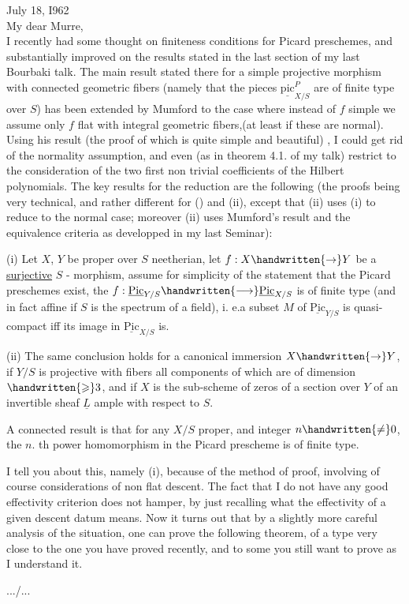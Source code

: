 July 18, I962\\

My dear Murre,\\

I recently had some thought on finiteness conditions for Picard preschemes, and substantially improved on the results stated in the last section of my last Bourbaki talk. The main result stated there for a simple projective morphism with connected geometric fibers (namely that the pieces $\underline{\mathrm{pic}}^{P}_{X/S}$ are of finite type over $S$) has been extended by Mumford to the case where instead of $f$ simple we assume only $f$ flat with integral geometric fibers,(at least if these are normal). Using his result (the proof of which is quite simple and beautiful) , I could get rid of the normality assumption, and even (as in theorem 4.1. of my talk) restrict to the consideration of the two first non trivial coefficients of the Hilbert polynomials. The key results for the reduction are the following (the proofs being very technical, and rather different for () and (ii), except that (ii) uses (i) to reduce to the normal case; moreover (ii) uses Mumford's result and the equivalence criteria as developped in my last Seminar):

(i) Let $X$, $Y$ be proper over $S$ neetherian, let $f:X\handwritten{\to}Y$ be a \uline{surjective} $S$ - morphism, assume for simplicity of the statement that the Picard preschemes exist, the $f:\underline{\mathrm{Pic}}_{Y/S}\handwritten{\longrightarrow}\underline{\mathrm{Pic}}_{X/S}$ is of finite type (and in fact affine if $S$ is the spectrum of a field), i. e.a subset $M$ of $\underline{\mathrm{Pic}}_{Y/S}$ is quasi-compact iff its image in $\underline{\mathrm{Pic}}_{X/S}$ is.

(ii) The same conclusion holds for a canonical immersion $X\handwritten{\to}Y$, if $Y/S$ is projective with fibers all components of which are of dimension $\handwritten{\geqslant}3$, and if $X$ is the sub-scheme of zeros of a section over $Y$ of an invertible sheaf $\underline{L}$ ample with respect to $S$.

A connected result is that for any $X/S$ proper, and integer $n\handwritten{\ne}0$, the $n$. th power homomorphism in the Picard prescheme is of finite type.

I tell you about this, namely (i), because of the method of proof, involving of course considerations of non flat descent. The fact that I do not have any good effectivity criterion does not hamper, by just recalling what the effectivity of a given descent datum means. Now it turns out that by a slightly more careful analysis of the situation, one can prove the following theorem, of a type very close to the one you have proved recently, and to some you still want to prove as I understand it.

\hfill .../...\par
